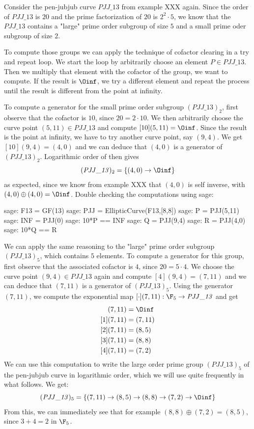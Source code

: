 \begin{example} Consider the pen-jubjub curve $\mathit{PJJ\_13}$ from example XXX again. Since the order of $\mathit{PJJ\_13}$ is $20$ and the prime factorization of $20$ is $2^2\cdot 5$, we know that the $\mathit{PJJ\_13}$ contains a "large" prime order subgroup of size $5$ and a small prime oder subgroup of size $2$. 

To compute those groups we can apply the technique of cofactor clearing in a try and repeat loop. We start the loop by arbitrarily choose an element $P\in \mathit{PJJ\_13}$. Then we multiply that element with the cofactor of the group, we want to compute. If the result is $\Oinf$, we try a different element and repeat the process until the result is different from the point at infinity.  

To compute a generator for the small prime order subgroup $(\mathit{PJJ\_13})_2$, first observe that the cofactor is $10$, since $20=2\cdot 10$. We then arbitrarily choose the curve point $(5,11)\in \mathit{PJJ\_13}$ and compute $[10](5,11)=\Oinf$. Since the result is the point at infinity, we have to try another curve point, say $(9,4)$. We get $[10](9,4)=(4,0)$ and we can deduce that $(4,0)$ is a generator of $(\mathit{PJJ\_13})_2$. Logarithmic order of then gives
$$
(\mathit{PJJ\_13})_2 = \{(4,0)\to \Oinf\}
$$
as expected, since we know from example XXX that $(4,0)$ is self inverse, with $(4,0)\oplus (4,0)=\Oinf$. Double checking the computations using sage: 
\begin{sagecommandline}
sage: F13 = GF(13)
sage: PJJ = EllipticCurve(F13,[8,8])
sage: P = PJJ(5,11)
sage: INF = PJJ(0)
sage: 10*P == INF
sage: Q = PJJ(9,4)
sage: R = PJJ(4,0)
sage: 10*Q == R
\end{sagecommandline}
We can apply the same reasoning to the "large" prime order subgroup $(\mathit{PJJ\_13})_5$, which contains $5$ elements. To compute a generator for this group, first observe that the associated cofactor is $4$, since $20=5\cdot 4$. We choose the curve point $(9,4)\in \mathit{PJJ\_13}$ again and compute $[4](9,4)=(7,11)$ and we can deduce that $(7,11)$ is a generator of $(\mathit{PJJ\_13})_5$. Using the generator $(7,11)$, we compute the exponential map $[\cdot](7,11): \F_5 \to \mathit{PJJ\_13}$ and get
\begin{align*}
[0](7,11) &= \Oinf\\
[1](7,11) &= (7,11)\\
[2](7,11) &= (8,5)\\
[3](7,11) &= (8,8)\\
[4](7,11) &= (7,2)
\end{align*}
We can use this computation to write the large order prime group $(\mathit{PJJ\_13})_5$ of the pen-jubjub curve in logarithmic order, which we will use quite frequently in what follows. We get:
$$
(\mathit{PJJ\_13})_5 = \{(7,11)\to(8,5)\to(8,8)\to(7,2)\to \Oinf\}
$$
From this, we can immediately see that for example $(8,8)\oplus (7,2)= (8,5)$, since 
$3+4=2$ in $\F_5$.
\end{example}
